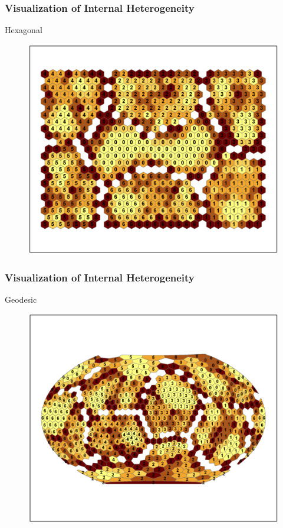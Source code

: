 \documentclass[nototal,handout]{beamer}
\begin{document}
\begin{frame}
	\frametitle{Visualization of Internal Heterogeneity}
 
\begin{block}{Hexagonal}
  \begin{center}
  \begin{figure}
  \includegraphics[width=0.70\linewidth]{hex_clusters.png}
  \end{figure}
  \end{center}
 \end{block} \end{frame} 

\begin{frame}
	\frametitle{Visualization of Internal Heterogeneity}
 
\begin{block}{Geodesic}
  \begin{center}
  \begin{figure}
  \includegraphics[width=0.70\linewidth]{geodesic_clusters.png}
  \end{figure}
  \end{center}
 \end{block} \end{frame} 
\end{document}
